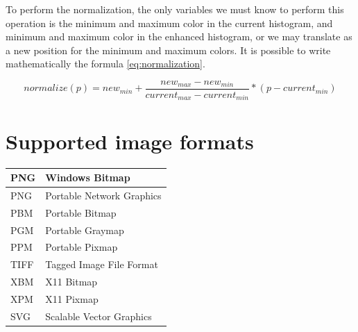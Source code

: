 \documentclass{article}
\begin{document}
		

		To perform the normalization, the only variables we must know to perform this operation is the minimum and maximum color in the current histogram, 
		and minimum and maximum color in the enhanced histogram, or we may translate as a new position for the minimum and maximum colors. It is possible
		to write mathematically the formula \ref{eq:normalization}.


		\begin{equation}
			normalize(p)=new_{min}+\frac{new_{max}-new_{min}}{current_{max}-current_{min}}*(p-current_{min})
			\label{eq:normalization}
		\end{equation}
		
		
\section{Supported image formats}


		\begin{center}
		    \begin{tabular}{ | l | l |}
		    \hline
		    	PNG & Windows Bitmap \\ \hline
			PNG & Portable Network Graphics\\ \hline
			PBM & Portable Bitmap\\ \hline
			PGM & Portable Graymap\\ \hline
			PPM & Portable Pixmap\\ \hline
			TIFF & Tagged Image File Format\\ \hline
			XBM & X11 Bitmap\\ \hline
			XPM & X11 Pixmap\\ \hline
			SVG & Scalable Vector Graphics\\ \hline
		    \end{tabular}
\end{center}
\end{document}
